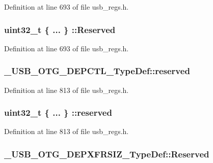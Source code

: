 Definition at line 693 of file usb\-\_\-regs.\-h.

\hypertarget{group___u_s_b___o_t_g___d_r_i_v_e_r_ga11116259fbde09472e1ab27d42c2714a}{
\subsubsection[{Reserved}]{\setlength{\rightskip}{0pt plus 5cm}uint32\-\_\-t \{ ... \} \-::Reserved}}\label{group___u_s_b___o_t_g___d_r_i_v_e_r_ga11116259fbde09472e1ab27d42c2714a}


Definition at line 693 of file usb\-\_\-regs.\-h.

\hypertarget{group___u_s_b___o_t_g___d_r_i_v_e_r_ga0ba2580866ac970f191b94772a602611}{
\subsubsection[{reserved}]{ \-\_\-\-U\-S\-B\-\_\-\-O\-T\-G\-\_\-\-D\-E\-P\-C\-T\-L\-\_\-\-Type\-Def\-::reserved}}\label{group___u_s_b___o_t_g___d_r_i_v_e_r_ga0ba2580866ac970f191b94772a602611}


Definition at line 813 of file usb\-\_\-regs.\-h.

\hypertarget{group___u_s_b___o_t_g___d_r_i_v_e_r_ga77fa1186c38c8735b5cffb88942240c0}{
\subsubsection[{reserved}]{\setlength{\rightskip}{0pt plus 5cm}uint32\-\_\-t \{ ... \} \-::reserved}}\label{group___u_s_b___o_t_g___d_r_i_v_e_r_ga77fa1186c38c8735b5cffb88942240c0}


Definition at line 813 of file usb\-\_\-regs.\-h.

\hypertarget{group___u_s_b___o_t_g___d_r_i_v_e_r_gae7b0cc98b67492a7d1b0b798e19b6eeb}{
\subsubsection[{Reserved}]{ \-\_\-\-U\-S\-B\-\_\-\-O\-T\-G\-\_\-\-D\-E\-P\-X\-F\-R\-S\-I\-Z\-\_\-\-Type\-Def\-::\-Reserved}}\label{group___u_s_b___o_t_g___d_r_i_v_e_r_gae7b0cc98b67492a7d1b0b798e19b6eeb}


